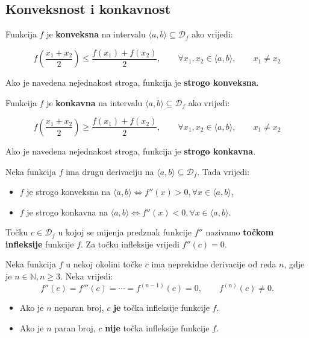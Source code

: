 \subsection{Konveksnost i konkavnost}

Funkcija $f$ je \textbf{konveksna} na intervalu $\langle a,b \rangle\subseteq\mathcal{D}_f$
ako vrijedi:

$$
f\left(\frac{x_1+x_2}{2}\right) \leq \frac{f(x_1)+f(x_2)}{2},\qquad\forall x_1,x_2 \in \langle a,b \rangle,\qquad x_1\neq x_2
$$

Ako je navedena nejednakost stroga, funkcija je \textbf{strogo konveksna}.


Funkcija $f$ je \textbf{konkavna} na intervalu $\langle a,b \rangle\subseteq\mathcal{D}_f$
ako vrijedi:

$$
f\left(\frac{x_1+x_2}{2}\right) \geq \frac{f(x_1)+f(x_2)}{2},\qquad\forall x_1,x_2 \in \langle a,b \rangle,\qquad x_1\neq x_2
$$

Ako je navedena nejednakost stroga, funkcija je \textbf{strogo konkavna}.

\begin{theorembox}
    Neka funkcija $f$ ima drugu derivaciju na $\langle a,b \rangle\subseteq\mathcal{D}_f$.
    Tada vrijedi:
    \begin{itemize}
        \item $f$ je strogo konveksna na $\langle a,b \rangle \Leftrightarrow f''(x)>0,\forall x \in \langle a,b \rangle$,
        \item $f$ je strogo konkavna na $\langle a,b \rangle \Leftrightarrow f''(x)<0,\forall x \in \langle a,b \rangle$.
    \end{itemize}
\end{theorembox}

Točku $c\in\mathcal{D}_f$ u kojoj se mijenja predznak funkcije $f''$ nazivamo
\textbf{točkom infleksije} funkcije $f$. Za točku infleksije vrijedi $f''(c) = 0$.

\begin{theorembox}
    Neka funkcija $f$ u nekoj okolini točke $c$ ima neprekidne derivacije od
    reda $n$, gdje je $n\in\mathbb{N}, n\geq 3$.
    Neka vrijedi:
    $$
    f''(c)=f'''(c)=\cdots=f^{(n-1)}(c)=0,\qquad f^{(n)}(c) \neq 0.
    $$

    \begin{itemize}
        \item Ako je $n$ neparan broj, $c$ \textbf{je} točka infleksije funkcije $f$.
        \item Ako je $n$ paran broj, $c$ \textbf{nije} točka infleksije funkcije $f$.
    \end{itemize}
\end{theorembox}

